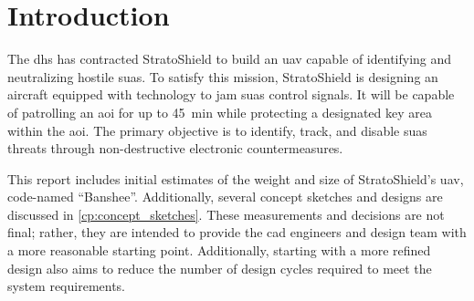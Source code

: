 \chapter{Introduction}\label{cp:introduction}

The \acrfull{dhs} has contracted StratoShield to build an \acrfull{uav} capable of identifying and neutralizing hostile \acrfull{suas}. To satisfy this mission, StratoShield is designing an aircraft equipped with technology to jam \acrshort{suas} control signals. It will be capable of patrolling an \acrfull{aoi} for up to \qty{45}{\minute} while protecting a designated key area within the \acrshort{aoi}. The primary objective is to identify, track, and disable \acrshort{suas} threats through non-destructive electronic countermeasures.

This report includes initial estimates of the weight and size of StratoShield's \acrshort{uav}, code-named ``Banshee''. Additionally, several concept sketches and designs are discussed in \autoref{cp:concept_sketches}. These measurements and decisions are not final; rather, they are intended to provide the \acrfull{cad} engineers and design team with a more reasonable starting point. Additionally, starting with a more refined design also aims to reduce the number of design cycles required to meet the system requirements.
